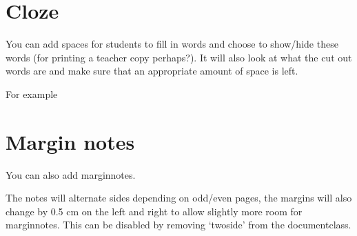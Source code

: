 \documentclass[11pt,a4paper,twoside]{report}
\begin{document}
\GridOn

\section{Cloze}

You can add spaces for students to fill in words and choose to show/hide these words (for printing a teacher copy perhaps?). It will also look at what the cut out words are and make sure that an appropriate amount of space is left.


For example 


\section{Margin notes}
You can also add marginnotes. 

The notes will alternate sides depending on odd/even pages, the margins will also change by 0.5 cm on the left and right to allow slightly more room for marginnotes. This can be disabled by removing `twoside' from the documentclass.
\end{document}
